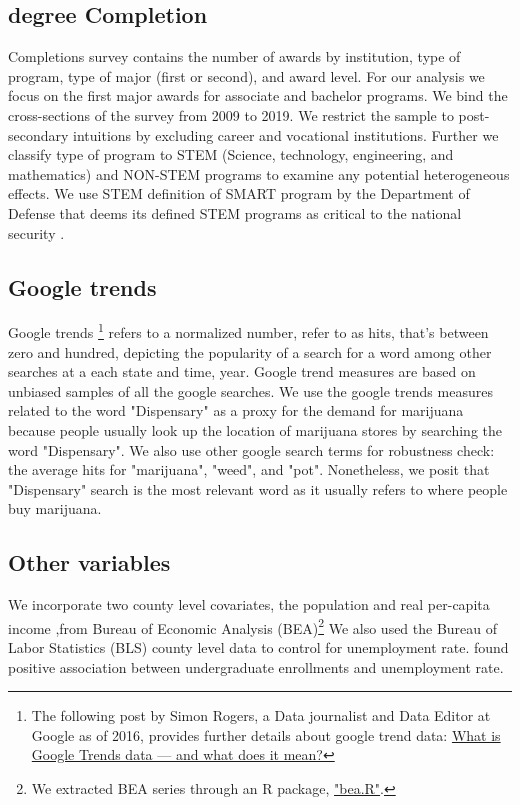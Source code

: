 \documentclass[12pt]{article}%
\begin{document}
\subsection{degree Completion}
Completions survey  contains the number of awards by institution, type of program, type of major (first or second), and award level. For our analysis we focus on the first major awards for associate and bachelor programs. We bind the cross-sections of the survey from 2009 to 2019. We restrict the sample to post-secondary intuitions by excluding career and vocational institutions. Further we classify type of program to STEM (Science, technology, engineering, and mathematics) and NON-STEM programs to examine any potential heterogeneous effects. We use STEM definition of SMART program by the Department of Defense that deems its defined STEM programs as critical to the national security \citep{smartscholarship}.

\subsection{Google trends}
Google trends \footnote{The following post by Simon Rogers, a Data journalist and Data Editor at Google as of 2016, provides further details about google trend data: \href{https://medium.com/google-news-lab/what-is-google-trends-data-and-what-does-it-mean-b48f07342ee8}{What is Google Trends data — and what does it mean?} }
refers to a normalized number, refer to as hits, that's between zero and hundred, depicting the popularity of a search for a word among other searches at a each state and time, year. Google trend measures are based on unbiased samples of all the google searches. We use the google trends measures related to the word "Dispensary" as a proxy for the demand for marijuana because people usually look up the location of marijuana stores by searching the word "Dispensary".  We also use other google search terms for robustness check: the average hits for "marijuana", "weed", and "pot". Nonetheless, we posit that "Dispensary" search is the most relevant word as it usually refers to where people buy marijuana. 

\subsection{Other variables}


We incorporate two county level covariates, the population and real per-capita income ,from Bureau of Economic Analysis (BEA)\footnote{We extracted BEA series through an R package, \href{https://www.bea.gov/resources/for-developers}{"bea.R"}. } We also used the Bureau of Labor Statistics (BLS) county level data to control for unemployment rate. \cite{hillman2013community} found positive association between undergraduate enrollments and unemployment rate. 
\end{document}
